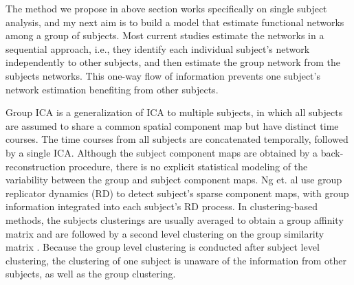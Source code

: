\documentclass[12pt]{article}
\begin{document}
The method we propose in above section \cite{liu2011monte} works specifically on
single subject analysis, and my next aim is to build a model that estimate
functional networks among a group of subjects.  Most current studies estimate
the networks in a sequential approach, i.e., they identify each individual
subject's network independently to other subjects, and then estimate the group
network from the subjects networks. This one-way flow of information prevents
one subject's network estimation benefiting from other subjects.

Group ICA \cite{calhoun2001spatial} is a generalization of ICA to multiple
subjects, in which all subjects are assumed to share a common spatial component
map but have distinct time courses. The time courses from all subjects are
concatenated temporally, followed by a single ICA. Although the subject
component maps are obtained by a back-reconstruction procedure, there is no
explicit statistical modeling of the variability between the group and subject
component maps.  Ng et. al \cite{nggroup2012} use group replicator dynamics (RD)
to detect subject's sparse component maps, with group information integrated
into each subject's RD process. In clustering-based methods, the subjects
clusterings are usually averaged to obtain a group affinity matrix and are
followed by a second level clustering on the group similarity matrix
\cite{bellec2010multi,van2008normalized}. Because the group level clustering is
conducted after subject level clustering, the clustering of one subject is
unaware of the information from other subjects, as well as the group clustering.
\end{document}
